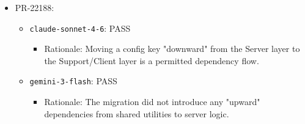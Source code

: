 \documentclass[sigconf,screen]{acmart}
\begin{document}
\begin{itemize}
\begin{itemize}
\begin{itemize}
            \item \texttt{gemini-3-flash}: PASS
            \begin{itemize}
                \item Rationale: The data-structure update stayed within existing architectural mappings for API types.
            \end{itemize}
        \end{itemize}
        \item PR-22188:
        \begin{itemize}
            \item \texttt{claude-sonnet-4-6}: PASS
            \begin{itemize}
                \item Rationale: Moving a config key "downward" from the Server layer to the Support/Client layer is a permitted dependency flow.
            \end{itemize}
            \item \texttt{gemini-3-flash}: PASS
            \begin{itemize}
                \item Rationale: The migration did not introduce any "upward" dependencies from shared utilities to server logic.
            \end{itemize}
        \end{itemize}
    \end{itemize}
\end{itemize}
\end{document}
